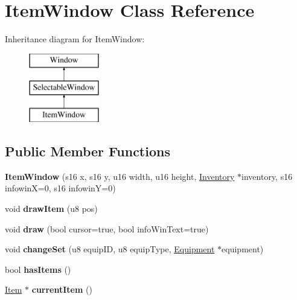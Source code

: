 \hypertarget{classItemWindow}{\section{Item\-Window Class Reference}
\label{classItemWindow}
}
Inheritance diagram for Item\-Window\-:\begin{figure}[H]
\begin{center}
\leavevmode
\includegraphics[height=3.000000cm]{classItemWindow}
\end{center}
\end{figure}
\subsection*{Public Member Functions}
\begin{DoxyCompactItemize}
\item 
\hypertarget{classItemWindow_a23f76769ab7374f40a1d4b45180e492c}{{\bfseries Item\-Window} (s16 x, s16 y, u16 width, u16 height, \hyperlink{classInventory}{Inventory} $\ast$inventory, s16 infowin\-X=0, s16 infowin\-Y=0)}\label{classItemWindow_a23f76769ab7374f40a1d4b45180e492c}

\item 
\hypertarget{classItemWindow_a77d161b9abee9e5afd4116fee24c0bd3}{void {\bfseries draw\-Item} (u8 pos)}\label{classItemWindow_a77d161b9abee9e5afd4116fee24c0bd3}

\item 
\hypertarget{classItemWindow_aaebbeb39fd0130eb137b11a593ea9740}{void {\bfseries draw} (bool cursor=true, bool info\-Win\-Text=true)}\label{classItemWindow_aaebbeb39fd0130eb137b11a593ea9740}

\item 
\hypertarget{classItemWindow_a5ea243b742a868a13a1c26cf0e43b523}{void {\bfseries change\-Set} (u8 equip\-I\-D, u8 equip\-Type, \hyperlink{classEquipment}{Equipment} $\ast$equipment)}\label{classItemWindow_a5ea243b742a868a13a1c26cf0e43b523}

\item 
\hypertarget{classItemWindow_a2e20d76641d8fc050c35bdceb11c1271}{bool {\bfseries has\-Items} ()}\label{classItemWindow_a2e20d76641d8fc050c35bdceb11c1271}

\item 
\hypertarget{classItemWindow_af397b141803171fc3e4cdb8fc71da1ca}{\hyperlink{classItem}{Item} $\ast$ {\bfseries current\-Item} ()}\label{classItemWindow_af397b141803171fc3e4cdb8fc71da1ca}

\end{DoxyCompactItemize}
